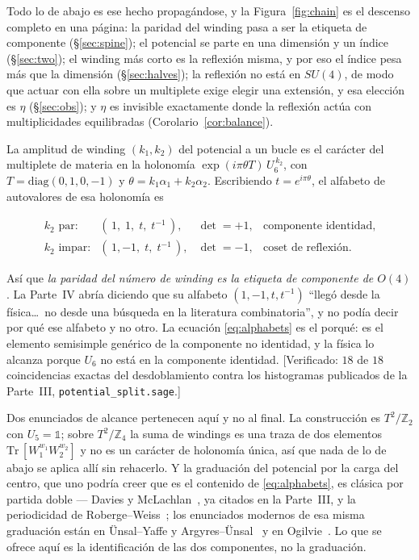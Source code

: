 \documentclass[11pt,a4paper]{article}
\newcommand{\ZZ}{\mathbb{Z}}
\newcommand{\one}{\mathds{1}}
\newcommand{\su}[1]{SU(#1)}
\newenvironment{keyeq}
  {\begin{center}\setlength{\fboxsep}{9pt}\setlength{\fboxrule}{0.8pt}%
   \begin{lrbox}{\keyeqbox}\begin{minipage}{0.88\textwidth}}
  {\end{minipage}\end{lrbox}%
   \fcolorbox{hdrblue!55}{hdrblue!6}{\usebox{\keyeqbox}}\end{center}}
\begin{document}
Todo lo de abajo es ese hecho propagándose, y la Figura~\ref{fig:chain} es el descenso completo en
una página: la paridad del winding pasa a ser la etiqueta de componente (\S\ref{sec:spine}); el
potencial se parte en una dimensión y un índice (\S\ref{sec:two}); el winding más corto es la
reflexión misma, y por eso el índice pesa más que la dimensión (\S\ref{sec:halves}); la reflexión no
está en $\su4$, de modo que actuar con ella sobre un multiplete exige elegir una extensión, y esa
elección es $\eta$ (\S\ref{sec:obs}); y $\eta$ es invisible exactamente donde la reflexión actúa con
multiplicidades equilibradas (Corolario~\ref{cor:balance}).

La amplitud de winding $(k_1,k_2)$ del potencial a un bucle es el carácter del multiplete de materia
en la holonomía $\exp(i\pi\theta T)\,U_6^{\,k_2}$, con $T=\mathrm{diag}(0,1,0,-1)$ y
$\theta=k_1\alpha_1+k_2\alpha_2$. Escribiendo $t=e^{i\pi\theta}$, el alfabeto de autovalores de esa
holonomía es
\begin{keyeq}
\begin{equation}\label{eq:alphabets}
\begin{array}{llll}
k_2 \text{ par:} & (\,1,\;1,\;t,\;t^{-1}\,), & \det=+1, & \text{componente identidad},\\[2pt]
k_2 \text{ impar:} & (\,1,-1,\;t,\;t^{-1}\,), & \det=-1, & \text{coset de reflexión.}
\end{array}
\end{equation}
\end{keyeq}
Así que \emph{la paridad del número de winding es la etiqueta de componente de $O(4)$}. La Parte~IV
abría diciendo que su alfabeto $(1,-1,t,t^{-1})$ ``llegó desde la física\dots\ no desde una búsqueda
en la literatura combinatoria'', y no podía decir por qué ese alfabeto y no otro. La ecuación
\eqref{eq:alphabets} es el porqué: es el elemento semisimple genérico de la componente no identidad,
y la física lo alcanza porque $U_6$ no está en la componente identidad. [Verificado: $18$ de $18$
coincidencias exactas del desdoblamiento contra los histogramas publicados de la Parte~III,
\texttt{potential\_split.sage}.]

Dos enunciados de alcance pertenecen aquí y no al final. La construcción es $T^2/\ZZ_2$ con
$U_5=\one$; sobre $T^2/\ZZ_4$ la suma de windings es una traza de dos elementos
$\mathrm{Tr}\,[W_1^{w_1}W_2^{w_2}]$ y no es un carácter de holonomía única, así que nada de lo de
abajo se aplica allí sin rehacerlo. Y la graduación del potencial por la carga del centro, que uno
podría creer que es el contenido de \eqref{eq:alphabets}, es clásica por partida doble --- Davies y
McLachlan~\cite{DM}, ya citados en la Parte~III, y la periodicidad de Roberge--Weiss~\cite{RW}; los
enunciados modernos de esa misma graduación están en \"Unsal--Yaffe y
Argyres--\"Unsal~\cite{ArgyresUnsal} y en Ogilvie~\cite{Ogilvie}. Lo que se ofrece aquí es la
identificación de las dos componentes, no la graduación.
\end{document}
